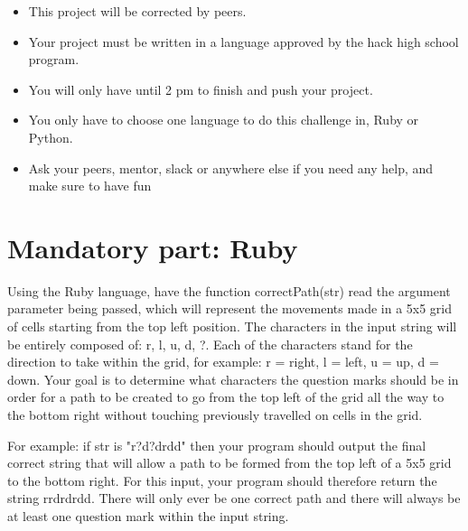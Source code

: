 \documentclass{42-en}
\begin{document}
    \begin{itemize}\itemsep1pt
        \item This project will be corrected by peers.
        \item Your project must be written in a language approved by
        the hack high school program.
        \item You will only have until 2 pm to finish and push your project.
        \item You only have to choose one language to do this challenge in,
         Ruby or Python.
        \item Ask your peers, mentor, slack or anywhere else if you need
        any help, and make sure to have fun\\
    \end{itemize}


\chapter{Mandatory part: Ruby}
    Using the Ruby language, have the function correctPath(str) read the argument parameter being passed, which will represent the movements made in a 5x5 grid of cells starting from the top left position. The characters in the input string will be entirely composed of: r, l, u, d, ?. Each of the characters stand for the direction to take within the grid, for example: r = right, l = left, u = up, d = down. Your goal is to determine what characters the question marks should be in order for a path to be created to go from the top left of the grid all the way to the bottom right without touching previously travelled on cells in the grid. 

    For example: if str is "r?d?drdd" then your program should output the final correct string that will allow a path to be formed from the top left of a 5x5 grid to the bottom right. For this input, your program should therefore return the string rrdrdrdd. There will only ever be one correct path and there will always be at least one question mark within the input string. 
\end{document}
